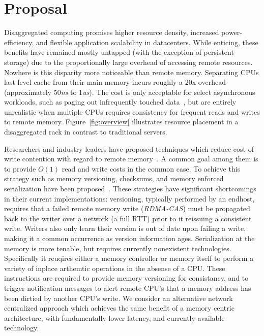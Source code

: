 \section{Proposal}
\label{sec:intro}

Disaggregated computing promises higher resource density, increased
power-efficiency, and flexible application scalability in datacenters.
While enticing, these benefits have remained mostly untapped (with the
exception of persistent storage) due to the proportionally large
overhead of accessing remote resources. Nowhere is this disparity more
noticeable than remote memory. Separating CPUs last level cache from
their main memory incurs roughly a 20x overhead (approximately
50\textit{ns} to 1\textit{us}).  The cost is only acceptable for
select asynchronous workloads, such as paging out infrequently touched
data~\cite{gms}, but are entirely unrealistic when multiple CPUs
requires consistency for frequent reads and writes to remote memory.
Figure~\ref{fig:overview} illustrates resource placement in a
disaggregated rack in contrast to traditional servers.

Researchers and industry leaders have proposed techniques which reduce
cost of write contention with regard to remote
memory~\cite{aguilera2019designing,cell,sonuma,storm,clover}. A common
goal among them is to provide $O(1)$ read and write costs in the
common case. To achieve this strategy such as memory versioning,
checksums, and memory enforced serialization have been
proposed~\cite{aguilera2019designing}. These strategies have
significant shortcomings in their current implementations: versioning,
typically performed by an endhost, requires that a failed remote
memory write (\textit{RDMA-CAS})  must be propagated back to the
writer over a network (a full RTT) prior to it reissuing a consistent
write. Writers also only learn their version is out of date upon
failing a write, making it a common occurrence as version information
ages.  Serialization at the memory is more tenable, but requires
currently nonexistent technologies. Specifically it reuqires either a
memory controller or memory itself to perform a variety of inplace
arthemtic operations in the absense of a CPU. These instructions are
required to provide memory versioning for consistancy, and to trigger
notification messages to alert remote CPU's that a memory address has
been dirtied by another CPU's write.  We consider an alternative
network centralized approach which achieves the same benefit of a memory
centric architecture, with fundamentally lower latency, and currently
available technology. 


